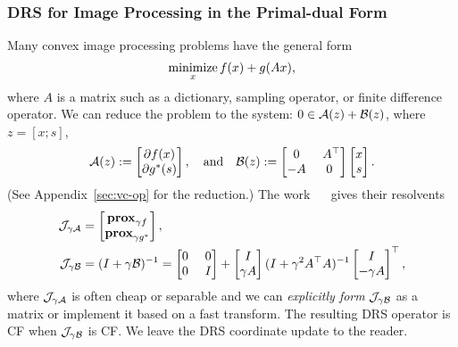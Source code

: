 \subsubsection{DRS for Image Processing in the Primal-dual Form \cite{o2014primal}}
 Many convex image processing problems have the general form
$$\operatorname*{minimize}_{x} f(x) + g(Ax),$$
where $A$ is a matrix such as a dictionary, sampling operator, or finite difference operator. We can reduce the problem to the system: $0\in{\mathcal{A}}(z) + {\mathcal{B}}(z)$, where $z=[x;s]$,
$$\cA(z):=\begin{bmatrix}\partial f(x)\\\partial g^*(s)\end{bmatrix},\quad\mbox{and}\quad \cB(z):=\begin{bmatrix}0 & ~A^\top  \\ -A & 0\end{bmatrix}\begin{bmatrix}x\\s\end{bmatrix}.$$
(See Appendix~\ref{sec:vc-op} for the reduction.) The work \mbox{%
\cite{o2014primal} }%
gives their resolvents    
\begin{align*}\cJ_{\gamma \cA} &= \begin{bmatrix}\prox_{\gamma f}\\\prox_{\gamma g^*}\end{bmatrix},\\ 
\cJ_{\gamma \cB} &= (I+\gamma \cB)^{-1}= \begin{bmatrix} 0 &~ 0 \\ 0 &~ I\end{bmatrix}+\begin{bmatrix}I\\ \gamma A\end{bmatrix}(I+\gamma^2 A^\top A)^{-1}\begin{bmatrix}I\\ -\gamma A\end{bmatrix}^\top ,
\end{align*}
where ${\mathcal{J}}_{\gamma {\mathcal{A}}}$ is often cheap or separable and we can \emph{explicitly form}  ${\mathcal{J}}_{\gamma {\mathcal{B}}}$  as a matrix or implement it based on a fast transform. The resulting DRS operator is CF when ${\mathcal{J}}_{\gamma {\mathcal{B}}}$ is CF. We leave the DRS coordinate update to the reader.

